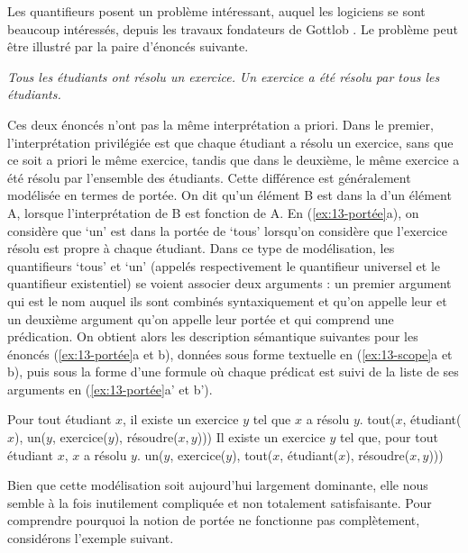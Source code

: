 {Les quantifieurs posent un problème intéressant, auquel les logiciens se sont beaucoup intéressés, depuis les travaux fondateurs de Gottlob \citet{frege1892uber}. Le problème peut être illustré par la paire d’énoncés suivante.

\ea\label{ex:13-portée}
\ea \textit{Tous les étudiants ont résolu un exercice.}
\ex \textit{Un exercice a été résolu par tous les étudiants.}\z\z

Ces deux énoncés n’ont pas la même interprétation a priori. Dans le premier, l’interprétation privilégiée est que chaque étudiant a résolu un exercice, sans que ce soit a priori le même exercice, tandis que dans le deuxième, le même exercice a été résolu par l’ensemble des étudiants. Cette différence est généralement modélisée en termes de portée. On dit qu’un élément B est dans la  d’un élément A, lorsque l’interprétation de B est fonction de A. En (\ref{ex:13-portée}a), on considère que ‘un’ est dans la portée de ‘tous’ lorsqu’on considère que l’exercice résolu est propre à chaque étudiant. Dans ce type de modélisation, les quantifieurs ‘tous’ et ‘un’ (appelés respectivement le quantifieur universel et le quantifieur existentiel) se voient associer deux arguments : un premier argument qui est le nom auquel ils sont combinés syntaxiquement et qu’on appelle leur  et un deuxième argument qu’on appelle leur portée et qui comprend une prédication. On obtient alors les description sémantique suivantes pour les énoncés (\ref{ex:13-portée}a et b), données sous forme textuelle en (\ref{ex:13-scope}a et b), puis sous la forme d’une formule où chaque prédicat est suivi de la liste de ses arguments en (\ref{ex:13-portée}a’ et b’).


\begin{exe}\label{ex:13-scope}
    \ex
	\begin{xlist}[b'.]
		 Pour tout étudiant $x$, il existe un exercice $y$ tel que $x$ a résolu $y$.
		 tout($x$, étudiant($x$), un($y$, exercice($y$), résoudre($x,y$)))
		 Il existe un exercice $y$ tel que, pour tout étudiant $x$, $x$ a résolu $y$.
		 un($y$, exercice($y$), tout($x$, étudiant($x$), résoudre($x,y$)))
	\end{xlist}	
\end{exe}

Bien que cette modélisation soit aujourd’hui largement dominante, elle nous semble à la fois inutilement compliquée et non totalement satisfaisante. Pour comprendre pourquoi la notion de portée ne fonctionne pas complètement, considérons l’exemple suivant.

}
